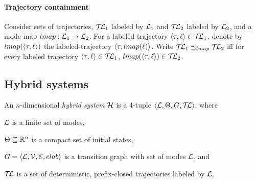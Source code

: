 \paragraph{Trajectory containment}
Consider sets of trajectories, $\mathcal{T\mkern-3mu L}_1$ labeled by ${\mathcal L}_1$ and
$\mathcal{T\mkern-3mu L}_2$ labeled by ${\mathcal L}_2$, and a mode map ${\sc lmap}: {\mathcal L}_1 \rightarrow
{\mathcal L}_2$.
%
For a labeled trajectory $\langle \tau,\ell \rangle \in \mathcal{T\mkern-3mu L}_1$, denote by ${\sc lmap}(\langle \tau,\ell \rangle)$ the labeled-trajectory
$\langle \tau,{\sc lmap}(\ell) \rangle$.  Write $\mathcal{T\mkern-3mu L}_1
\preceq_{{\sc lmap}} \mathcal{T\mkern-3mu L}_2$ iff for every labeled trajectory $\langle
\tau,\ell \rangle \in \mathcal{T\mkern-3mu L}_1$, ${\sc lmap}(\langle \tau,\ell \rangle) \in
\mathcal{T\mkern-3mu L}_2$.
%

\subsection{Hybrid systems}
\begin{definition}	
An $n$-dimensional  {\em hybrid system\/} ${\mathcal H}$ is a 4-tuple $\langle {\mathcal L}, \Theta, G, \mathcal{T\mkern-3mu L} \rangle$, where
\begin{inparaenum}[(a)]
\item ${\mathcal L}$ is a finite set of modes, 
\item $\Theta \subseteq \reals^n$ is a compact set of initial states,
\item $G = \langle {\mathcal L}, {\mathcal V}, {\mathcal E}, {\sc elab} \rangle$ is a transition graph
  with set of modes ${\mathcal L}$, and
\item $\mathcal{T\mkern-3mu L}$ is a set of deterministic, prefix-closed trajectories
  labeled by ${\mathcal L}$.
\end{inparaenum}
\end{definition}

